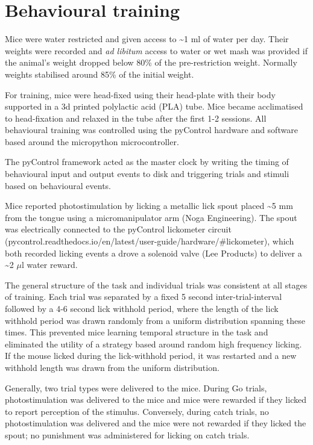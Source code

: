 \section{Behavioural training}

Mice were water restricted and given access to \textasciitilde1 ml of water per day. Their weights were recorded and \textit{ad libitum} access to water or wet mash was provided if the animal's weight dropped below 80\% of the pre-restriction weight. Normally weights stabilised around 85\% of the initial weight.   

For training, mice were head-fixed using their head-plate with their body supported in a 3d printed polylactic acid (PLA) tube. Mice became acclimatised to head-fixation and relaxed in the tube after the first 1-2 sessions. All behavioural training was controlled using the pyControl hardware and software \cite{akam_pycontrol_2021} based around the micropython microcontroller. 

The pyControl framework acted as the master clock by writing the timing of behavioural input and output events to disk and triggering trials and stimuli based on behavioural events.

Mice reported photostimulation by licking a metallic lick spout placed \textasciitilde5 mm from the tongue using a micromanipulator arm (Noga Engineering). The spout was electrically connected to the pyControl lickometer circuit \\ (pycontrol.readthedocs.io/en/latest/user-guide/hardware/#lickometer), which both recorded licking events a drove a solenoid valve (Lee Products) to deliver a \textasciitilde2 $\mu$l water reward.

The general structure of the task and individual trials was consistent at all stages of training. Each trial was separated by a fixed 5 second inter-trial-interval followed by a 4-6 second lick withhold period, where the length of the lick withhold period was drawn randomly from a uniform distribution spanning these times. This prevented mice learning temporal structure in the task and eliminated the utility of a strategy based around random high frequency licking. If the mouse licked during the lick-withhold period, it was restarted and a new withhold length was drawn from the uniform distribution. 

Generally, two trial types were delivered to the mice. During Go trials, photostimulation was delivered to the mice and mice were rewarded if they licked to report perception of the stimulus. Conversely, during catch trials, no photostimulation was delivered and the mice were not rewarded if they licked the spout; no punishment was administered for licking on catch trials. 


